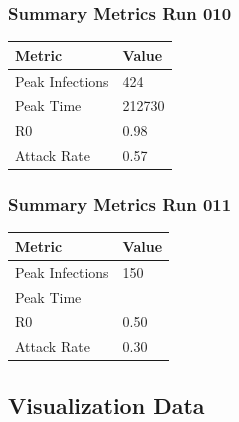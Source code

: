 \documentclass{article}
\begin{document}
\subsubsection{Summary Metrics Run 010}
\begin{tabular}{| l | l |}
  \hline
  Metric & Value \\
  \hline\hline
  Peak Infections & 424 \\
  \hline
  Peak Time & 212730 \\
  \hline
  R0 & 0.98 \\
  \hline
  Attack Rate & 0.57 \\
  \hline
\end{tabular} 
\subsubsection{Summary Metrics Run 011}
\begin{tabular}{| l | l |}
  \hline
  Metric & Value \\
  \hline\hline
  Peak Infections & 150  \\
  \hline
  Peak Time &  \\
  \hline
  R0 & 0.50 \\
  \hline
  Attack Rate & 0.30 \\
  \hline
\end{tabular} 

\subsection{Visualization Data}
\end{document}
